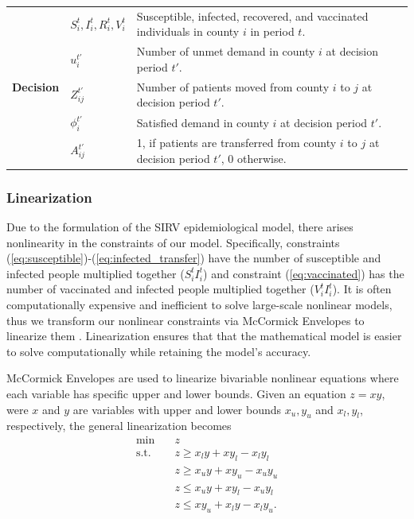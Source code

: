 \documentclass{article}
\begin{document}
\begin{table}[h]
\begin{tabular}{|p{}|p{}|p{}|}
        \hline
        \multirow{5}{*}{\textbf{Decision}}
        \multirow{5}{*}{\textbf{Variables}} 
        & $S_i^t, I_i^t, R_i^t, V_i^t$ & Susceptible, infected, recovered, and vaccinated individuals in county $i$ in period $t$. \\
        & $u_i^{t'}$ & Number of unmet demand in county $i$ at decision period $t'$. \\
        & $Z_{ij}^{t'}$ & Number of patients moved from county $i$ to $j$ at decision period $t'$. \\
        & $\phi_i^{t'}$ & Satisfied demand in county $i$ at decision period $t'$. \\
        & $A_{ij}^{t'}$ & 1, if patients are transferred from county $i$ to $j$ at decision period $t'$, 0 otherwise. \\
        \hline
    \end{tabular}\label{tab:modelNotation}
\end{table}

\subsubsection{Linearization}
Due to the formulation of the SIRV epidemiological model, there arises nonlinearity in the constraints of our model. Specifically, constraints (\ref{eq:susceptible})-(\ref{eq:infected_transfer}) have the number of susceptible and infected people multiplied together ($S_i^t I_i^t$) and constraint (\ref{eq:vaccinated}) has the number of vaccinated and infected people multiplied together ($V_i^t I_i^t$). It is often computationally expensive and inefficient to solve large-scale nonlinear models, thus we transform our nonlinear constraints via McCormick Envelopes to linearize them \parencite{mccormick1976computability}. Linearization ensures that that the mathematical model is easier to solve computationally while retaining the model's accuracy.

McCormick Envelopes are used to linearize bivariable nonlinear equations where each variable has specific upper and lower bounds. Given an equation $ z = xy $, were $x$ and $y$ are variables with upper and lower bounds $ x_u, y_u$ and $x_l, y_l$, respectively, the general linearization becomes 
\[
    \begin{aligned}
        \min \quad & z \\
        \text{s.t.} \quad 
        &z \geq x_l y + x y_l - x_l y_l \\
        &z \geq x_u y + x y_u - x_u y_u \\
        &z \leq x_u y + x y_l - x_u y_l \\
        &z \leq x y_u + x_l y - x_l y_u.
    \end{aligned}
\]
\end{document}
